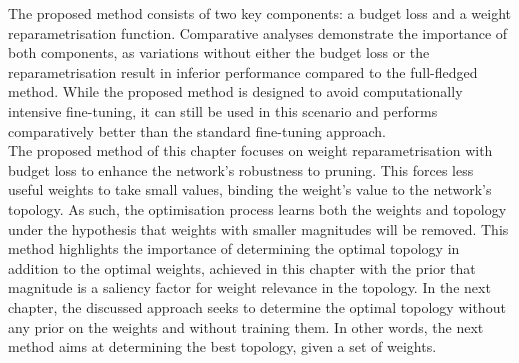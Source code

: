 The proposed method consists of two key components: a budget loss and a weight
reparametrisation function. Comparative analyses demonstrate the importance of
both components, as variations without either the budget loss or the
reparametrisation result in inferior performance compared to the full-fledged
method. While the proposed method is designed to avoid computationally intensive
fine-tuning, it can still be used in this scenario and performs comparatively
better than the standard fine-tuning approach.\\

The proposed method of this chapter focuses on weight reparametrisation with
budget loss to enhance the network's robustness to pruning. This forces less
useful weights to take small values, binding the weight's value to the network's
topology. As such, the optimisation process learns both the weights and topology
under the hypothesis that weights with smaller magnitudes will be removed. This
method highlights the importance of determining the optimal topology in addition
to the optimal weights, achieved in this chapter with the prior that magnitude
is a saliency factor for weight relevance in the topology. In the next chapter,
the discussed approach seeks to determine the optimal topology without any prior
on the weights and without training them. In other words, the next method aims
at determining the best topology, given a set of weights.

